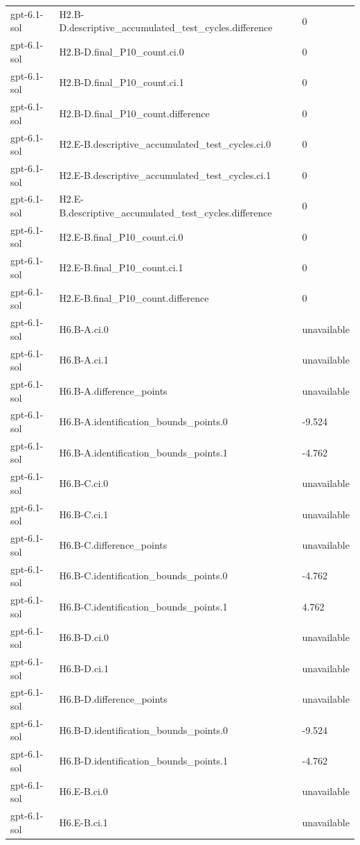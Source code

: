 \begin{tabular}{lll}
gpt-6.1-sol & H2.B-D.descriptive\_accumulated\_test\_cycles.difference & 0 \\
gpt-6.1-sol & H2.B-D.final\_P10\_count.ci.0 & 0 \\
gpt-6.1-sol & H2.B-D.final\_P10\_count.ci.1 & 0 \\
gpt-6.1-sol & H2.B-D.final\_P10\_count.difference & 0 \\
gpt-6.1-sol & H2.E-B.descriptive\_accumulated\_test\_cycles.ci.0 & 0 \\
gpt-6.1-sol & H2.E-B.descriptive\_accumulated\_test\_cycles.ci.1 & 0 \\
gpt-6.1-sol & H2.E-B.descriptive\_accumulated\_test\_cycles.difference & 0 \\
gpt-6.1-sol & H2.E-B.final\_P10\_count.ci.0 & 0 \\
gpt-6.1-sol & H2.E-B.final\_P10\_count.ci.1 & 0 \\
gpt-6.1-sol & H2.E-B.final\_P10\_count.difference & 0 \\
gpt-6.1-sol & H6.B-A.ci.0 & unavailable \\
gpt-6.1-sol & H6.B-A.ci.1 & unavailable \\
gpt-6.1-sol & H6.B-A.difference\_points & unavailable \\
gpt-6.1-sol & H6.B-A.identification\_bounds\_points.0 & -9.524 \\
gpt-6.1-sol & H6.B-A.identification\_bounds\_points.1 & -4.762 \\
gpt-6.1-sol & H6.B-C.ci.0 & unavailable \\
gpt-6.1-sol & H6.B-C.ci.1 & unavailable \\
gpt-6.1-sol & H6.B-C.difference\_points & unavailable \\
gpt-6.1-sol & H6.B-C.identification\_bounds\_points.0 & -4.762 \\
gpt-6.1-sol & H6.B-C.identification\_bounds\_points.1 & 4.762 \\
gpt-6.1-sol & H6.B-D.ci.0 & unavailable \\
gpt-6.1-sol & H6.B-D.ci.1 & unavailable \\
gpt-6.1-sol & H6.B-D.difference\_points & unavailable \\
gpt-6.1-sol & H6.B-D.identification\_bounds\_points.0 & -9.524 \\
gpt-6.1-sol & H6.B-D.identification\_bounds\_points.1 & -4.762 \\
gpt-6.1-sol & H6.E-B.ci.0 & unavailable \\
gpt-6.1-sol & H6.E-B.ci.1 & unavailable \\

\end{tabular}
